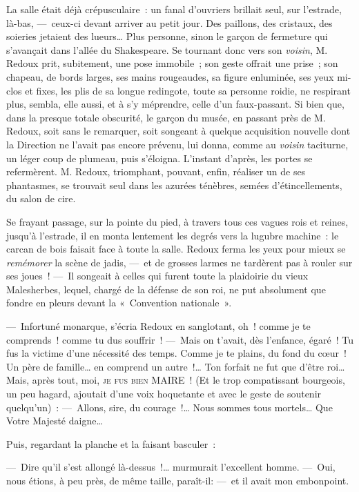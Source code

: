 \documentclass[french,twoside]{book} %
\begin{document}
La salle était déjà crépusculaire : un fanal d’ouvriers brillait seul, sur l’estrade, là-bas, — ceux-ci devant arriver au petit jour. Des paillons, des cristaux, des soieries jetaient des lueurs… Plus personne, sinon le garçon de fermeture qui s’avançait dans l’allée du Shakespeare. Se tournant donc vers son \emph{voisin}, M. Redoux prit, subitement, une pose immobile ; son geste offrait une prise ; son chapeau, de bords larges, ses mains rougeaudes, sa figure enluminée, ses yeux mi-clos et fixes, les plis de sa longue redingote, toute sa personne roidie, ne respirant plus, sembla, elle aussi, et à s’y méprendre, celle d’un faux-passant. Si bien que, dans la   presque totale obscurité, le garçon du musée, en passant près de M. Redoux, soit sans le remarquer, soit songeant à quelque acquisition nouvelle dont la Direction ne l’avait pas encore prévenu, lui donna, comme au \emph{voisin} taciturne, un léger coup de plumeau, puis s’éloigna. L’instant d’après, les portes se refermèrent. M. Redoux, triomphant, pouvant, enfin, réaliser un de ses phantasmes, se trouvait seul dans les azurées ténèbres, semées d’étincellements, du salon de cire.\par
Se frayant passage, sur la pointe du pied, à travers tous ces vagues rois et reines, jusqu’à l’estrade, il en monta lentement les degrés vers la lugubre machine : le carcan de bois faisait face à toute la salle. Redoux ferma les yeux pour mieux se \emph{remémorer} la scène de jadis, — et de grosses larmes ne tardèrent pas à rouler sur ses joues ! — Il songeait à celles qui furent toute la plaidoirie du vieux Malesherbes, lequel, chargé de la défense de son roi, ne put absolument que fondre en pleurs devant la « Convention nationale ».\par
— Infortuné monarque, s’écria Redoux en   sanglotant, oh ! comme je te comprends ! comme tu dus souffrir ! — Mais on t’avait, dès l’enfance, égaré ! Tu fus la victime d’une nécessité des temps. Comme je te plains, du fond du cœur ! Un père de famille… en comprend un autre !… Ton forfait ne fut que d’être roi… Mais, après tout, moi, {\scshape je fus bien MAIRE} ! (Et le trop compatissant bourgeois, un peu hagard, ajoutait d’une voix hoquetante et avec le geste de soutenir quelqu’un) : — Allons, sire, du courage !… Nous sommes tous mortels… Que Votre Majesté daigne…\par
Puis, regardant la planche et la faisant basculer :\par
— Dire qu’il s’est allongé là-dessus !… murmurait l’excellent homme. — Oui, nous étions, à peu près, de même taille, paraît-il: — et il avait mon embonpoint.\par
\end{document}
